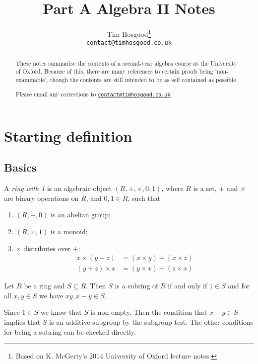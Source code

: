 \documentclass{maths}
\author{Tim Hosgood\thanks{Based on K. McGerty's 2014 University of Oxford lecture notes.}\\\texttt{contact@timhosgood.co.uk}}
\title{Part A Algebra II Notes}
\begin{document}
\maketitle

\begin{abstract}
    These notes summarise the contents of a second-year algebra course at the University of Oxford.
    Because of this, there are many references to certain proofs being `non-examinable', though the contents are still intended to be as self contained as possible.

    Please email any corrections to \href{mailto:contact@timhosgood.co.uk}{\texttt{contact@timhosgood.co.uk}}.
\end{abstract}

\tableofcontents

\section{Starting definition}

\subsection{Basics}

\begin{defn}[Rings]
    A \emph{ring with 1} is an algebraic object $(R,+,\times,0,1)$, where $R$ is a set, $+$ and $\times$ are binary operations on $R$, and $0,1\in R$, such that
    \begin{enumerate}
        \item $(R,+,0)$ is an abelian group;
        \item $(R,\times,1)$ is a monoid;
        \item $\times$ distributes over $+$:
        \begin{align*}
            x\times(y+z)
            &=
            (x\times y) + (x\times z)\\
            (y+z)\times x
            &=
            (y\times x) + (z\times x)
        \end{align*}
    \end{enumerate}
\end{defn}

\begin{lem}
    Let $R$ be a ring and $S\subseteq R$.
    Then $S$ is a subring of $R$ if and only if $1\in S$ and for all $x,y\in S$ we have $xy,x-y\in S$.
\end{lem}
\begin{prf}
    Since $1\in S$ we know that $S$ is non empty.
    Then the condition that $x-y\in S$ implies that $S$ is an additive subgroup by the subgroup test.
    The other conditions for being a subring can be checked directly.
\end{prf}
\end{document}
